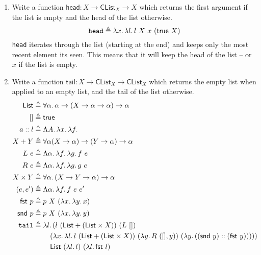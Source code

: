 \documentclass[10pt,\jkfside,a4paper]{article}
\begin{document}
\begin{enumerate}
\begin{enumerate}
        \item Write a function $\mathsf{head}: X \to \mathsf{CList}_X \to X$ which returns the first argument if the list is empty and the head of the list otherwise.
        \[
            \texttt{head} \triangleq \lambda x\ldotp \lambda l\ldotp l\ X\ x\ (\mathsf{true}\ X)
        \]
        \texttt{head} iterates through the list (starting at the end) and keeps only the most recent element its seen. This means that it will keep the head of the list -- or $x$ if the list is empty.

        \item Write a function $\mathsf{tail}: X \to \mathsf{CList}_X \to \mathsf{CList}_X$ which returns the empty list when applied to an empty list, and the tail of the list otherwise.
        \begin{align*}
            \mathsf{List} &\triangleq \forall \alpha\ldotp \alpha \to (X \to \alpha \to \alpha) \to \alpha \\
            [] &\triangleq \mathsf{true} \\
            a::l &\triangleq \Lambda A\ldotp \lambda x\ldotp \lambda f\ldotp \\
            X + Y &\triangleq \forall \alpha (X \to \alpha) \to (Y \to \alpha) \to \alpha \\
            L\ e &\triangleq \Lambda \alpha\ldotp \lambda f\ldotp \lambda g\ldotp f\ e \\
            R\ e &\triangleq \Lambda \alpha\ldotp \lambda f\ldotp \lambda g\ldotp g\ e \\
            X \times Y &\triangleq \forall \alpha \ldotp (X \to Y \to \alpha) \to \alpha \\
            (e, e') &\triangleq \Lambda \alpha \ldotp \lambda f\ldotp f\ e\ e' \\
            \mathsf{fst}\ p &\triangleq p\ X\ (\lambda x\ldotp \lambda y\ldotp x) \\
            \mathsf{snd}\ p &\triangleq p\ X\ (\lambda x\ldotp \lambda y\ldotp y) \\
            \texttt{tail} &\triangleq
            \lambda l\ldotp
            (l
            \
            (\mathsf{List}+(\mathsf{List} \times X))
            \
            (L\ [])
            \\
            &\qquad\ (
                \lambda x\ldotp \lambda l\ldotp
                l\
                (\mathsf{List}+(\mathsf{List} \times X))\
                (\lambda y\ldotp R\ ([], y))\
                (\lambda y\ldotp ((\mathsf{snd}\ y) :: (\mathsf{fst}\ y)))
            )
            )\\
            &\qquad\ \mathsf{List}\ (\lambda l\ldotp l)\ (\lambda l\ldotp \mathsf{fst}\ l)
        \end{align*}


\end{enumerate}
\end{enumerate}
\end{document}
